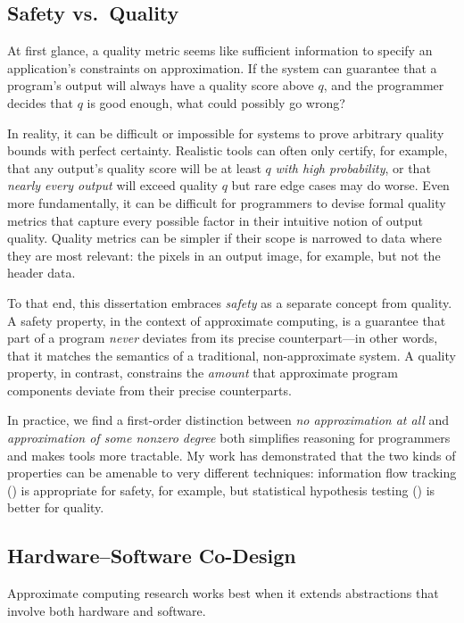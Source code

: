 \subsection{Safety vs.~Quality}
\label{sec:princ:safety}

At first glance, a quality metric seems like sufficient information to specify
an application's constraints on approximation.
If the system can guarantee that a program's output will always have a quality
score above $q$, and the programmer decides that $q$ is good enough, what
could possibly go wrong?

In reality, it can be difficult or impossible for systems to prove arbitrary
quality bounds with perfect certainty.
Realistic tools can often only certify, for example, that any output's quality
score will be at least $q$ \emph{with high probability},
or that \emph{nearly every output} will exceed quality $q$ but rare edge cases
may do worse.
Even more fundamentally, it can be difficult for programmers to devise formal
quality metrics that capture every possible factor in their intuitive notion
of output quality.
Quality metrics can be simpler if their scope is narrowed to data where they
are most relevant: the pixels in an output image, for example, but not the
header data.

To that end, this dissertation embraces \emph{safety} as a separate concept
from quality.
A safety property, in the context of approximate computing, is a guarantee
that part of a program \emph{never} deviates from its precise counterpart---in
other words, that it matches the semantics of a traditional, non-approximate
system.
A quality property, in contrast, constrains the \emph{amount} that approximate
program components deviate from their precise counterparts.

In practice, we find a first-order distinction between \emph{no approximation at
all} and \emph{approximation of some nonzero degree} both simplifies reasoning
for programmers and makes tools more tractable.
My work has demonstrated that the two kinds of properties can be amenable to
very different techniques:
information flow tracking () is appropriate for safety, for
example, but statistical hypothesis testing () is better for
quality.

\subsection{Hardware--Software Co-Design}

Approximate computing research works best when it extends abstractions that
involve both hardware and software.

